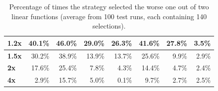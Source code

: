 \begin{table}[h!]
\begin{tabular}{|l|r|r|r|r|r|r|r|}
		\textbf{1.2x}  & 40.1\%                                                                              & 46.0\%                                                                            & 29.0\%                                                                              & 26.3\%                                                                              & 41.6\%                                                                            & 27.8\%                                                                              & 3.5\%                               \\ \hline
		\textbf{1.5x}  & 30.2\%                                                                              & 38.9\%                                                                            & 13.9\%                                                                              & 13.7\%                                                                              & 25.6\%                                                                            & 9.9\%                                                                               & 2.9\%                               \\ \hline
		\textbf{2x}    & 17.6\%                                                                              & 25.4\%                                                                            & 7.8\%                                                                               & 4.3\%                                                                               & 14.4\%                                                                            & 4.7\%                                                                               & 2.4\%                               \\ \hline
		\textbf{4x}    & 2.9\%                                                                               & 15.7\%                                                                            & 5.0\%                                                                               & 0.1\%                                                                               & 9.7\%                                                                             & 2.7\%                                                                               & 2.5\%                               \\ \hline
	\end{tabular}
	\egroup
	\caption{Percentage of times the strategy selected the worse one out of two linear functions (average from 100 test runs, each containing 140 selections).}
	\label{tab:strategy_comparison}
\end{table}

